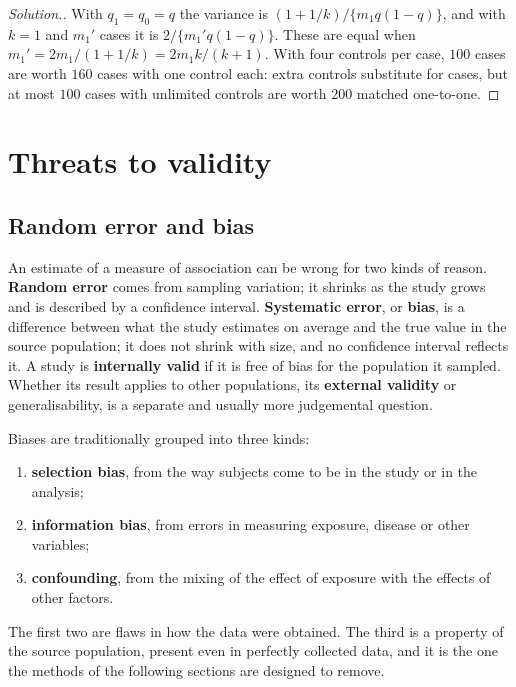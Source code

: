 \documentclass[11pt,a4paper]{article}
\numberwithin{equation}{section}
\theoremstyle{definition}
\newenvironment{solution}
  {\renewcommand{\qedsymbol}{}\begin{proof}[\textit{Solution}.]}
  {\end{proof}}
\begin{document}
\begin{solution}
With $q_1 = q_0 = q$ the variance is $(1 + 1/k)/\{m_1 q(1 - q)\}$, and with $k = 1$ and $m_1'$ cases it is $2/\{m_1' q(1 - q)\}$. These are equal when
$m_1' = 2m_1/(1 + 1/k) = 2m_1 k/(k + 1)$. With four controls per case, $100$ cases are worth $160$ cases with one control each: extra controls substitute
for cases, but at most $100$ cases with unlimited controls are worth $200$ matched one-to-one.
\end{solution}

\section{Threats to validity}
\label{sec:validity}

\subsection{Random error and bias}

An estimate of a measure of association can be wrong for two kinds of reason. \textbf{Random error} comes from sampling variation; it
shrinks as the study grows and is described by a confidence interval. \textbf{Systematic error}, or \textbf{bias}, is a difference between
what the study estimates on average and the true value in the source population; it does not shrink with size, and no confidence
interval reflects it. A study is \textbf{internally valid} if it is free of bias for the population it sampled. Whether its result
applies to other populations, its \textbf{external validity} or generalisability, is a separate and usually more judgemental question.

Biases are traditionally grouped into three kinds:
\begin{enumerate}
\item \textbf{selection bias}, from the way subjects come to be in the study or in the analysis;
\item \textbf{information bias}, from errors in measuring exposure, disease or other variables;
\item \textbf{confounding}, from the mixing of the effect of exposure with the effects of other factors.
\end{enumerate}
The first two are flaws in how the data were obtained. The third is a property of the source population, present even in perfectly
collected data, and it is the one the methods of the following sections are designed to remove.
\end{document}

